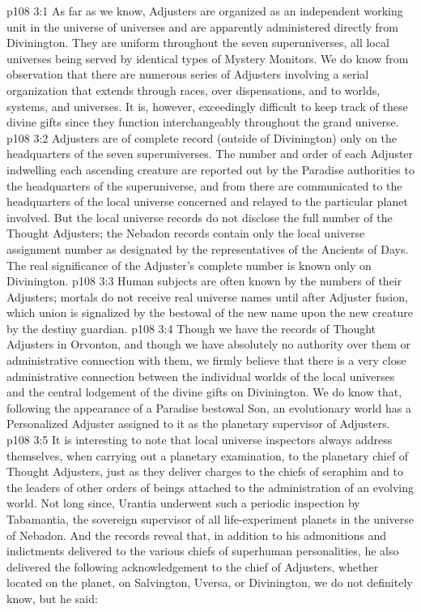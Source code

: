 \vs p108 3:1 As far as we know, Adjusters are organized as an independent working unit in the universe of universes and are apparently administered directly from Divinington. They are uniform throughout the seven superuniverses, all local universes being served by identical types of Mystery Monitors. We do know from observation that there are numerous series of Adjusters involving a serial organization that extends through races, over dispensations, and to worlds, systems, and universes. It is, however, exceedingly difficult to keep track of these divine gifts since they function interchangeably throughout the grand universe.
\vs p108 3:2 Adjusters are of complete record (outside of Divinington) only on the headquarters of the seven superuniverses. The number and order of each Adjuster indwelling each ascending creature are reported out by the Paradise authorities to the headquarters of the superuniverse, and from there are communicated to the headquarters of the local universe concerned and relayed to the particular planet involved. But the local universe records do not disclose the full number of the Thought Adjusters; the Nebadon records contain only the local universe assignment number as designated by the representatives of the Ancients of Days. The real significance of the Adjuster’s complete number is known only on Divinington.
\vs p108 3:3 Human subjects are often known by the numbers of their Adjusters; mortals do not receive real universe names until after Adjuster fusion, which union is signalized by the bestowal of the new name upon the new creature by the destiny guardian.
\vs p108 3:4 Though we have the records of Thought Adjusters in Orvonton, and though we have absolutely no authority over them or administrative connection with them, we firmly believe that there is a very close administrative connection between the individual worlds of the local universes and the central lodgement of the divine gifts on Divinington. We do know that, following the appearance of a Paradise bestowal Son, an evolutionary world has a Personalized Adjuster assigned to it as the planetary supervisor of Adjusters.
\vs p108 3:5 \pc It is interesting to note that local universe inspectors always address themselves, when carrying out a planetary examination, to the planetary chief of Thought Adjusters, just as they deliver charges to the chiefs of seraphim and to the leaders of other orders of beings attached to the administration of an evolving world. Not long since, Urantia underwent such a periodic inspection by Tabamantia, the sovereign supervisor of all life\hyp{}experiment planets in the universe of Nebadon. And the records reveal that, in addition to his admonitions and indictments delivered to the various chiefs of superhuman personalities, he also delivered the following acknowledgement to the chief of Adjusters, whether located on the planet, on Salvington, Uversa, or Divinington, we do not definitely know, but he said:

